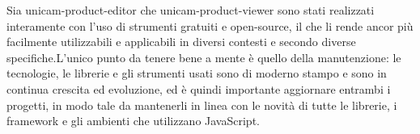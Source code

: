 Sia unicam-product-editor che unicam-product-viewer sono stati realizzati interamente 
con l'uso di strumenti gratuiti e open-source, il che li rende ancor più facilmente 
utilizzabili e applicabili in diversi contesti e secondo diverse specifiche.L'unico 
punto da tenere bene a mente è quello della manutenzione: le tecnologie, le librerie 
e gli strumenti usati sono di moderno stampo e sono in continua crescita ed evoluzione,
 ed è quindi importante aggiornare entrambi i progetti, in modo tale da mantenerli in
 linea con le novità di tutte le librerie, i framework e gli ambienti che utilizzano JavaScript.